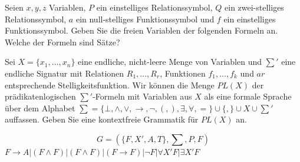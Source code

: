 \documentclass[10pt, a4paper]{exam}
\begin{document}
\begin{questions}
\begin{parts}
\begin{solution}
        \end{solution}
    \end{parts}

    \question Seien $x,y,z$ Variablen, $P$ ein  einstelliges  Relationssymbol, $Q$ ein  zwei-stelliges  Relationssymbol, $a$ ein  null-stelliges Funktionssymbol und $f$ ein einstelliges Funktionssymbol. Geben Sie die freien Variablen der folgenden Formeln an. Welche der Formeln sind Sätze?

    \question Sei $X=\{x_1,...,x_n\}$ eine endliche, nicht-leere Menge von Variablen und $\sum'$ eine endliche Signatur mit Relationen $R_1,...,R_r$, Funktionen $f_1,...,f_k$ und $ar$ entsprechende Stelligkeitsfunktion.
    Wir können die Menge $PL(X)$ der prädikatenlogischen $\sum'$-Formeln mit Variablen aus $X$ als eine formale Sprache über dem Alphabet $\sum=\{\bot,\wedge,\vee,\rightarrow,\lnot,(,),\exists,\forall,=\}\cup\{,\}\cup X \cup \sum'$ auffassen. Geben Sie eine kontextfreie Grammatik für $PL(X)$ an.
    \begin{solution}
        $$G = (\{F, X', A, T\}, \sum, P, F)$$
        $F\rightarrow A|(F\wedge F)|(F\wedge F)|(F\rightarrow F)|\lnot F| \forall X'F | \exists X'F$


\end{solution}
\end{questions}
\end{document}
